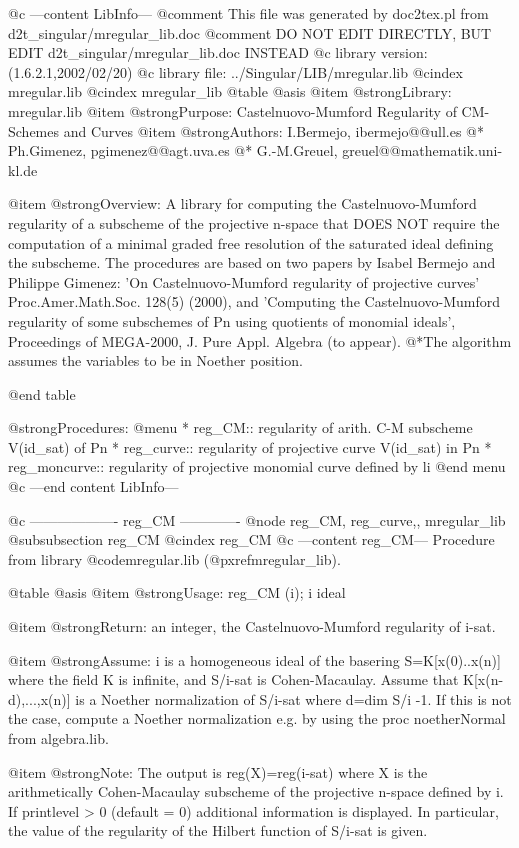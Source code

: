 @c ---content LibInfo---
@comment This file was generated by doc2tex.pl from d2t_singular/mregular_lib.doc
@comment DO NOT EDIT DIRECTLY, BUT EDIT d2t_singular/mregular_lib.doc INSTEAD
@c library version: (1.6.2.1,2002/02/20)
@c library file: ../Singular/LIB/mregular.lib
@cindex mregular.lib
@cindex mregular_lib
@table @asis
@item @strong{Library:}
mregular.lib
@item @strong{Purpose:}
   Castelnuovo-Mumford Regularity of CM-Schemes and Curves
@item @strong{Authors:}
I.Bermejo, ibermejo@@ull.es
@* Ph.Gimenez, pgimenez@@agt.uva.es
@* G.-M.Greuel, greuel@@mathematik.uni-kl.de

@item @strong{Overview:}
A library for computing the Castelnuovo-Mumford regularity of a subscheme of
the projective n-space that DOES NOT require the computation of a minimal
graded free resolution of the saturated ideal defining the subscheme.
The procedures are based on two papers by Isabel Bermejo and Philippe Gimenez:
'On Castelnuovo-Mumford regularity of projective curves' Proc.Amer.Math.Soc.
128(5) (2000), and 'Computing the Castelnuovo-Mumford regularity of some
subschemes of Pn using quotients of monomial ideals', Proceedings of
MEGA-2000, J. Pure Appl. Algebra (to appear).
@*The algorithm assumes the variables to be in Noether position.

@end table

@strong{Procedures:}
@menu
* reg_CM:: regularity of arith. C-M subscheme V(id_sat) of Pn
* reg_curve:: regularity of projective curve V(id_sat) in Pn
* reg_moncurve:: regularity of projective monomial curve defined by li
@end menu
@c ---end content LibInfo---

@c ------------------- reg_CM -------------
@node reg_CM, reg_curve,, mregular_lib
@subsubsection reg_CM
@cindex reg_CM
@c ---content reg_CM---
Procedure from library @code{mregular.lib} (@pxref{mregular_lib}).

@table @asis
@item @strong{Usage:}
reg_CM (i); i ideal

@item @strong{Return:}
an integer, the Castelnuovo-Mumford regularity of i-sat.

@item @strong{Assume:}
i is a homogeneous ideal of the basering S=K[x(0)..x(n)] where
the field K is infinite, and S/i-sat is Cohen-Macaulay.
Assume that K[x(n-d),...,x(n)] is a Noether normalization of S/i-sat
where d=dim S/i -1. If this is not the case, compute a Noether
normalization e.g. by using the proc noetherNormal from algebra.lib.

@item @strong{Note:}
The output is reg(X)=reg(i-sat) where X is the arithmetically
Cohen-Macaulay subscheme of the projective n-space defined by i.
If printlevel > 0 (default = 0) additional information is displayed.
In particular, the value of the regularity of the Hilbert function of
S/i-sat is given.

